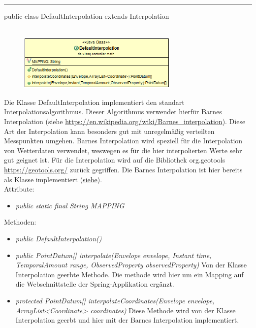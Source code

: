 \rule{\textwidth}{0.4pt}
public class DefaultInterpolation extends Interpolation
\\\\
    \begin{figure}[H]
        {\centering\includegraphics[width=0.7\textwidth]{media/backend/controller/classes/DefaultInterpolation.png}}
    \end{figure}
    Die Klasse DefaultInterpolation implementiert den standart Interpolationsalgorithmus.
    Dieser Algorithmus verwendet hierfür Barnes Interpolation (siehe \url{https://en.wikipedia.org/wiki/Barnes_interpolation}).
    Diese Art der Interpolation kann besonders gut mit unregelmäßig verteilten Messpunkten umgehen.
    Barnes Interpolation wird speziell für die Interpolation von Wetterdaten verwendet, weswegen es für die hier interpolierten Werte sehr gut geignet ist.
    Für die Interpolation wird auf die Bibliothek org.geotools \url{https://geotools.org/} zurück gegriffen.
    Die Barnes Interpolation ist hier bereits als Klasse implementiert (\href{http://docs.geotools.org/latest/javadocs/org/geotools/process/vector/BarnesSurfaceInterpolator.html}{siehe}).
\\
Attribute:
\begin{itemize}
    \item \emph{public static final String MAPPING} \mappingDescription
\end{itemize}
Methoden:
\begin{itemize}
    \item \emph{public DefaultInterpolation()}
    \item \emph{public PointDatum[] interpolate(Envelope envelope, Instant time, TemporalAmount range, ObservedProperty observedProperty)}
    Von der Klasse Interpolation geerbte Methode. Die methode wird hier um ein Mapping auf die Webschnittstelle der Spring-Applikation ergänzt.
   \item \emph{protected PointDatum[] interpolateCoordinates(Envelope envelope, ArrayList<Coordinate> coordinates)}
    Diese Methode wird von der Klasse Interpolation geerbt und hier mit der Barnes Interpolation implementiert.
\end{itemize}